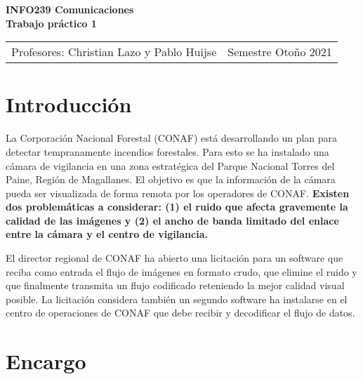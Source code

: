 \documentclass[11pt,letterpaper,spanish,oneside]{article}
\begin{document}
\pagestyle{empty}

\begin{center}
{\large \textbf{INFO239 Comunicaciones} \\ \textbf{Trabajo práctico 1}}
\end{center}

\begin{tabular}{l l}
Profesores: Christian Lazo y Pablo Huijse & \hspace{30mm} Semestre Otoño 2021 \\
\end{tabular}
\vspace{5mm}

\section*{Introducción}

La Corporación Nacional Forestal (CONAF) está desarrollando un plan para detectar tempranamente incendios forestales. Para esto se ha instalado una cámara de vigilancia en una zona estratégica del Parque Nacional Torres del Paine, Región de Magallanes. El objetivo es que la información de la cámara pueda ser visualizada de forma remota por los operadores de CONAF. \textbf{Existen dos problemáticas a considerar: (1) el ruido que afecta gravemente la calidad de las imágenes y (2) el ancho de banda limitado del enlace entre la cámara y el centro de vigilancia.}

El director regional de CONAF ha abierto una licitación para un software que reciba como entrada el flujo de imágenes en formato crudo, que elimine el ruido y que finalmente transmita un flujo codificado reteniendo la mejor calidad visual posible. La licitación considera también un segundo software ha instalarse en el centro de operaciones de CONAF que debe recibir y decodificar el flujo de datos. 

\section*{Encargo}
\end{document}
